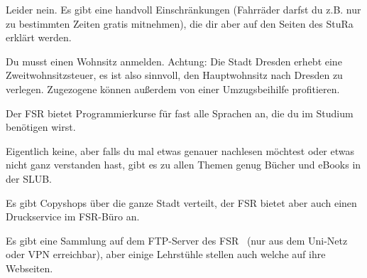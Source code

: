 Leider nein. Es gibt eine handvoll Einschränkungen (Fahrräder darfst du z.B. nur zu bestimmten Zeiten gratis mitnehmen), die dir aber auf den Seiten des StuRa~ erklärt werden.

Du musst einen Wohnsitz anmelden. Achtung: Die Stadt Dresden erhebt eine Zweitwohnsitzsteuer, es ist also sinnvoll, den Hauptwohnsitz nach Dresden zu verlegen. Zugezogene können außerdem von einer Umzugsbeihilfe profitieren.

Der FSR bietet Programmierkurse für fast alle Sprachen an, die du im Studium benötigen wirst. 

\label{minisec:faq}

Eigentlich keine, aber falls du mal etwas genauer nachlesen möchtest oder etwas nicht ganz verstanden hast, gibt es zu allen Themen genug Bücher und eBooks in der SLUB.~

Es gibt Copyshops über die ganze Stadt verteilt, der FSR bietet aber auch einen Druckservice im FSR-Büro an.

Es gibt eine Sammlung auf dem FTP-Server des FSR~ (nur aus dem Uni-Netz oder VPN erreichbar), aber einige Lehrstühle stellen auch welche auf ihre Webseiten.
